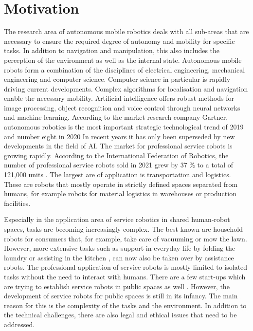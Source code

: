 \section{Motivation}
\label{sec:motivation}
The research area of autonomous mobile robotics deals with all sub-areas that are necessary to ensure the required degree of autonomy and mobility for specific tasks. In addition to navigation and manipulation, this also includes the perception of the environment as well as the internal state. Autonomous mobile robots form a combination of the disciplines of electrical engineering, mechanical engineering and computer science. Computer science in particular is rapidly driving current developments. Complex algorithms for localisation and navigation enable the necessary mobility. Artificial intelligence offers robust methods for image processing, object recognition and voice control through neural networks and machine learning. According to the market research company Gartner, autonomous robotics is the most important strategic technological trend of 2019 \cite{cearley_gartner_2018} and number eight in 2020 \cite{david_cearley_gartner_2019} In recent years it has only been superseded by new developments in the field of AI. The market for professional service robots is growing rapidly. According to the International Federation of Robotics, the number of professional service robots sold in 2021 grew by 37 \% to a total of 121,000 units \cite{international_federation_of_robotics_world_2022}. The largest are of application is transportation and logistics. These are robots that mostly operate in strictly defined spaces separated from humans, for example robots for material logistics in warehouses or production facilities.

Especially in the application area of service robotics in shared human-robot spaces, tasks are becoming increasingly complex. The best-known are household robots for consumers that, for example, take care of vacuuming or mow the lawn. However, more extensive tasks such as support in everyday life by folding the laundry \cite{srivastava_tractability_2015} or assisting in the kitchen \cite{becker_pr2_2011}, can now also be taken over by assistance robots. The professional application of service robots is mostly limited to isolated tasks without the need to interact with humans. There are a few start-ups which are trying to establish service robots in public spaces as well \cite{kittmann_let_2015}. However, the development of service robots for public spaces is still in its infancy. The main reason for this is the complexity of the tasks and the environment. In addition to the technical challenges, there are also legal and ethical issues that need to be addressed.

